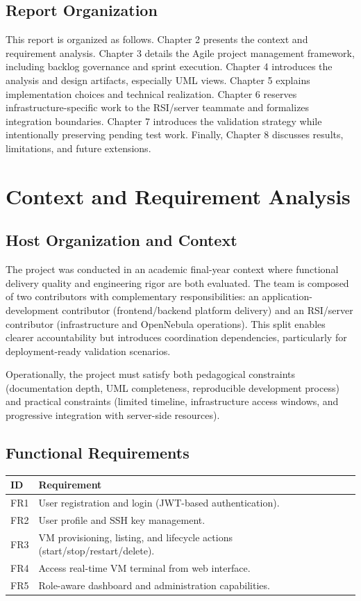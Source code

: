 \documentclass[12pt,a4paper]{report}
\begin{document}
\section{Report Organization}
This report is organized as follows.
Chapter 2 presents the context and requirement analysis.
Chapter 3 details the Agile project management framework, including backlog governance and sprint execution.
Chapter 4 introduces the analysis and design artifacts, especially UML views.
Chapter 5 explains implementation choices and technical realization.
Chapter 6 reserves infrastructure-specific work to the RSI/server teammate and formalizes integration boundaries.
Chapter 7 introduces the validation strategy while intentionally preserving pending test work.
Finally, Chapter 8 discusses results, limitations, and future extensions.

\chapter{Context and Requirement Analysis}
\section{Host Organization and Context}
The project was conducted in an academic final-year context where functional delivery quality and engineering rigor are both evaluated.
The team is composed of two contributors with complementary responsibilities: an application-development contributor (frontend/backend platform delivery) and an RSI/server contributor (infrastructure and OpenNebula operations).
This split enables clearer accountability but introduces coordination dependencies, particularly for deployment-ready validation scenarios.

Operationally, the project must satisfy both pedagogical constraints (documentation depth, UML completeness, reproducible development process) and practical constraints (limited timeline, infrastructure access windows, and progressive integration with server-side resources).

\section{Functional Requirements}
\begin{longtable}{p{} p{}}
\toprule
\textbf{ID} & \textbf{Requirement} \\
\midrule
FR1 & User registration and login (JWT-based authentication). \\
FR2 & User profile and SSH key management. \\
FR3 & VM provisioning, listing, and lifecycle actions (start/stop/restart/delete). \\
FR4 & Access real-time VM terminal from web interface. \\
FR5 & Role-aware dashboard and administration capabilities. \\
\bottomrule
\end{longtable}
\end{document}
